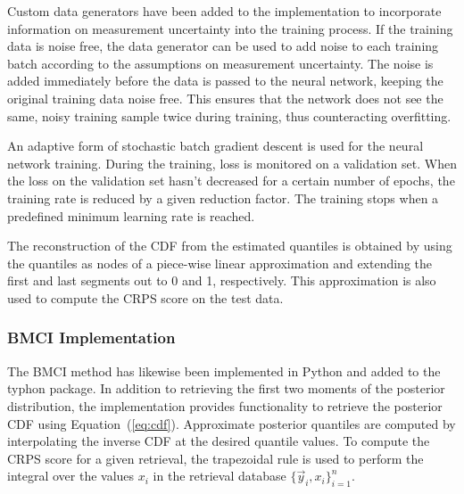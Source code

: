 \documentclass[journal abbreviation, manuscript]{copernicus}
\begin{document}
  Custom data generators have been added to the implementation  to incorporate
   information on measurement uncertainty into the training
  process. If the training data is noise free, the data generator can be used to
  add noise to each training batch according to the assumptions on measurement
  uncertainty. The noise is added immediately  before the data is passed to the
  neural network, keeping the original training data noise free. This ensures
  that the network does not see the same, noisy training sample twice during
  training, thus counteracting overfitting.


  An adaptive form of stochastic batch gradient descent is used for the neural
  network training. During the training, loss is monitored on a validation set.
  When the loss on the validation set hasn't decreased for a certain number of
  epochs, the training rate is reduced by a given reduction factor. The training
  stops when a predefined minimum learning rate is reached.

  The reconstruction of the CDF from the estimated quantiles is obtained
  by using the quantiles as nodes of a piece-wise linear approximation and
  extending the first and last segments out to 0 and 1, respectively.
  This approximation is also used to compute the CRPS score on the test
  data.


\subsubsection{BMCI Implementation}
\label{sec:implementation_bmci}

 The BMCI method has likewise been implemented in Python and added to the
 typhon package. In addition to retrieving the first two moments of the
 posterior distribution, the implementation provides functionality to
 retrieve the posterior CDF using Equation~(\ref{eq:cdf}). Approximate posterior
 quantiles are computed by interpolating the inverse CDF at the desired quantile
 values. To compute the CRPS score for a given retrieval, the trapezoidal rule
 is used to perform the integral over the values $x_i$ in the retrieval database
 $\{\vec{y}_i, x_i\}_{i = 1}^n$.
\end{document}
